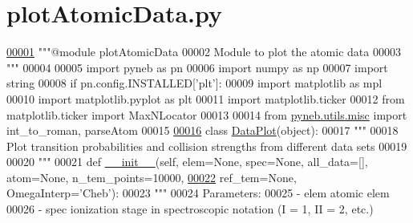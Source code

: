 \hypertarget{plot_atomic_data_8py_source}{}\section{plot\+Atomic\+Data.\+py}
\label{plot_atomic_data_8py_source}

\begin{DoxyCode}
\hypertarget{plot_atomic_data_8py_source_l00001}{}\hyperlink{namespacepyneb_1_1plot_1_1plot_atomic_data}{00001} \textcolor{stringliteral}{"""@module plotAtomicData}
00002 \textcolor{stringliteral}{Module to plot the atomic data}
00003 \textcolor{stringliteral}{"""} 
00004 
00005 \textcolor{keyword}{import} pyneb \textcolor{keyword}{as} pn
00006 \textcolor{keyword}{import} numpy \textcolor{keyword}{as} np
00007 \textcolor{keyword}{import} string
00008 \textcolor{keywordflow}{if} pn.config.INSTALLED[\textcolor{stringliteral}{'plt'}]:
00009     \textcolor{keyword}{import} matplotlib \textcolor{keyword}{as} mpl
00010     \textcolor{keyword}{import} matplotlib.pyplot \textcolor{keyword}{as} plt
00011     \textcolor{keyword}{import} matplotlib.ticker
00012     \textcolor{keyword}{from} matplotlib.ticker \textcolor{keyword}{import} MaxNLocator
00013 
00014 \textcolor{keyword}{from} \hyperlink{namespacepyneb_1_1utils_1_1misc}{pyneb.utils.misc} \textcolor{keyword}{import} int\_to\_roman, parseAtom
00015 
\hypertarget{plot_atomic_data_8py_source_l00016}{}\hyperlink{classpyneb_1_1plot_1_1plot_atomic_data_1_1_data_plot}{00016} \textcolor{keyword}{class }\hyperlink{classpyneb_1_1plot_1_1plot_atomic_data_1_1_data_plot}{DataPlot}(object):
00017     \textcolor{stringliteral}{"""}
00018 \textcolor{stringliteral}{    Plot transition probabilities and collision strengths from different data sets}
00019 \textcolor{stringliteral}{    }
00020 \textcolor{stringliteral}{    """}
00021     \textcolor{keyword}{def }\hyperlink{classpyneb_1_1plot_1_1plot_atomic_data_1_1_data_plot_af4b7b5510131c31e072909a6d20637c3}{\_\_init\_\_}(self, elem=None, spec=None, all\_data=[], atom=None, n\_tem\_points=10000, 
\hypertarget{plot_atomic_data_8py_source_l00022}{}\hyperlink{classpyneb_1_1plot_1_1plot_atomic_data_1_1_data_plot_af4b7b5510131c31e072909a6d20637c3}{00022}                  ref\_tem=\textcolor{keywordtype}{None}, OmegaInterp=\textcolor{stringliteral}{'Cheb'}):
00023         \textcolor{stringliteral}{"""}
00024 \textcolor{stringliteral}{    Parameters:}
00025 \textcolor{stringliteral}{        - elem         atomic elem }
00026 \textcolor{stringliteral}{        - spec       ionization stage in spectroscopic notation (I = 1, II = 2, etc.)}

\end{DoxyCode}
